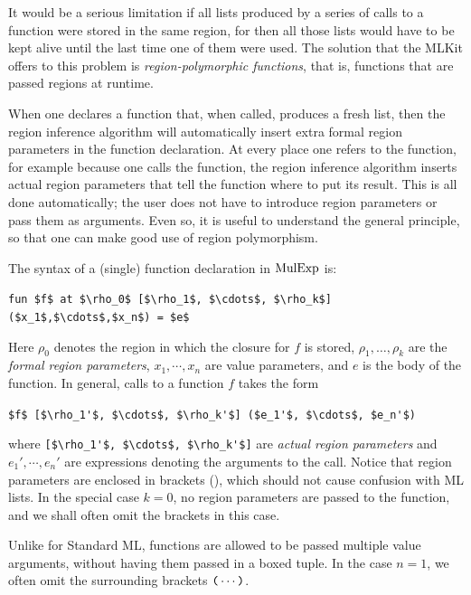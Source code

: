 \documentclass[12pt]{book}
\begin{document}
%
%
It would be a serious limitation if all lists produced by a series of calls to a
function were stored in the same region, for then all those lists would have to
be kept alive until the last time one of them were used. The solution that the
MLKit offers to this problem is {\em region-polymorphic functions}, that is,
functions that are passed regions at runtime.

When one declares a function that, when called, produces a fresh list, then the
region inference algorithm will automatically insert extra
%
%
formal region parameters in the function declaration.  At every place one refers
to the function, for example because one calls the function, the region
inference algorithm inserts
%
%
actual region parameters that tell the function where to put its result. This is
all done automatically; the user does not have to introduce region parameters or
pass them as arguments. Even so, it is useful to understand the general
principle, so that one can make good use of region polymorphism.

The syntax of a (single) function declaration in $\hbox{\rm MulExp}$ is:
\begin{center}
  \lstinline!fun $f$ at $\rho_0$ [$\rho_1$, $\cdots$, $\rho_k$] ($x_1$,$\cdots$,$x_n$) = $e$!
\end{center}
Here $\rho_0$ denotes the region in which the closure for $f$ is stored,
$\rho_1, \ldots,\rho_k$ are the
%
%
{\em formal region parameters}, $x_1,\cdots,x_n$ are value parameters, and $e$
is the body of the function.  In general, calls to a function $f$ takes the form
\begin{center}
  \lstinline!$f$ [$\rho_1'$, $\cdots$, $\rho_k'$] ($e_1'$, $\cdots$, $e_n'$)!
\end{center}
where \lstinline![$\rho_1'$, $\cdots$, $\rho_k'$]! are
%
%
{\em actual region parameters} and $e_1',\cdots,e_n'$ are expressions denoting
the arguments to the call. Notice that region parameters are enclosed in
brackets (\boxml{[ ]}), which should not cause confusion with ML lists. In the
special case $k=0$, no region parameters are passed to the function, and we
shall often omit the brackets in this case.

Unlike for Standard ML, functions are allowed to be passed multiple value
arguments, without having them passed in a boxed tuple. In the case $n=1$, we
often omit the surrounding brackets $\verb+(+ \cdots \verb+)+$.
\end{document}
